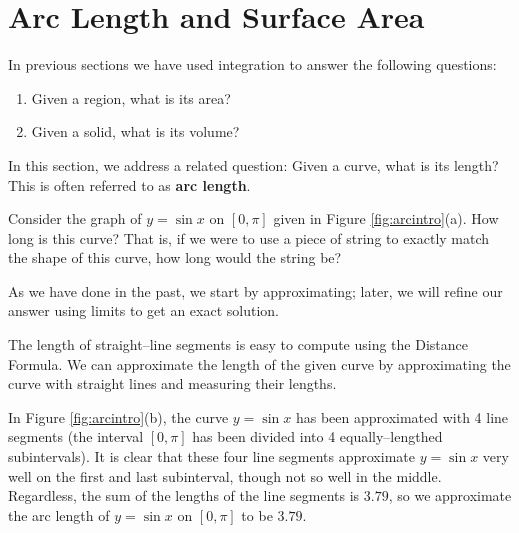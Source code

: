 \section{Arc Length and Surface Area}\label{sec:arc_length}

In previous sections we have used integration to answer the following questions:
	\begin{enumerate}
	\item		Given a region, what is its area?
	\item		Given a solid, what is its volume?
	\end{enumerate}
	
In this section, we address a related question: Given a curve, what is its length? This is often referred to as \textbf{arc length}. 

Consider the graph of $y=\sin x$ on $[0,\pi]$ given in Figure \ref{fig:arcintro}(a). How long is this curve? That is, if we were to use a piece of string to exactly match the shape of this curve, how long would the string be?

As we have done in the past, we start by approximating; later, we will refine our answer using limits to get an exact solution.

The length of straight--line segments is easy to compute using the Distance Formula. We can approximate the length of the given curve by approximating the curve with straight lines and measuring their lengths. 

In Figure \ref{fig:arcintro}(b), the curve $y=\sin x$ has been approximated with 4 line segments (the interval $[0,\pi]$ has been divided into 4 equally--lengthed subintervals). It is clear that these four line segments approximate $y=\sin x$ very well on the first and last subinterval, though not so well in the middle. Regardless, the sum of the lengths of the line segments is $3.79$, so we approximate the arc length of $y=\sin x$ on $[0,\pi]$ to be $3.79$. 

